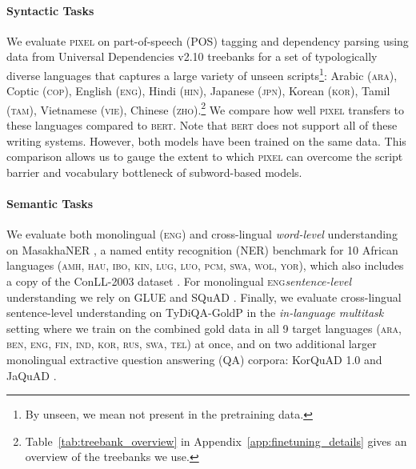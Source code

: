 \documentclass{article}
\newcommand{\model}{\textsc{pixel}\xspace}
\newcommand{\arabi}{\textsc{ara}\xspace}
\newcommand{\english}{\textsc{eng}\xspace}
\newcommand{\coptic}{\textsc{cop}\xspace}
\newcommand{\japanese}{\textsc{jpn}\xspace}
\newcommand{\hindi}{\textsc{hin}\xspace}
\newcommand{\korean}{\textsc{kor}\xspace}
\newcommand{\vietnamese}{\textsc{vie}\xspace}
\newcommand{\chinese}{\textsc{zho}\xspace}
\newcommand{\tamil}{\textsc{tam}\xspace}
\newcommand{\amharic}{\textsc{amh}\xspace}
\newcommand{\hausa}{\textsc{hau}\xspace}
\newcommand{\igbo}{\textsc{ibo}\xspace}
\newcommand{\kinyarwanda}{\textsc{kin}\xspace}
\newcommand{\luganda}{\textsc{lug}\xspace}
\newcommand{\luo}{\textsc{luo}\xspace}
\newcommand{\naija}{\textsc{pcm}\xspace}
\newcommand{\swahili}{\textsc{swa}\xspace}
\newcommand{\wolof}{\textsc{wol}\xspace}
\newcommand{\yoruba}{\textsc{yor}\xspace}
\newcommand{\russian}{\textsc{rus}\xspace}
\newcommand{\bengali}{\textsc{ben}\xspace}
\newcommand{\finnish}{\textsc{fin}\xspace}
\newcommand{\indonesian}{\textsc{ind}\xspace}
\newcommand{\telugu}{\textsc{tel}\xspace}
\begin{document}
\paragraph{Syntactic Tasks} We evaluate \model on part-of-speech (POS) tagging and dependency parsing using data from Universal Dependencies v2.10 treebanks \citep{nivre-etal-2020-universal, zeman-etal-2022-ud} for a set of typologically diverse languages that captures a large variety of unseen scripts\footnote{By unseen, we mean not present in the pretraining data.}: Arabic (\arabi), Coptic (\coptic), English (\english), Hindi (\hindi), Japanese (\japanese), Korean (\korean), Tamil (\tamil), Vietnamese (\vietnamese), Chinese (\chinese).\footnote{Table~\ref{tab:treebank_overview} in Appendix~\ref{app:finetuning_details} gives an overview of the treebanks we use.}
We compare how well \model{} transfers to these languages compared to \textsc{bert}. Note that \textsc{bert} does not support all of these writing systems. However, both models have been trained on the same data. This comparison allows us to gauge the extent to which \model can overcome the script barrier and vocabulary bottleneck of subword-based models.

\vspace{-2mm}
\paragraph{Semantic Tasks} We evaluate both monolingual (\english) and cross-lingual \emph{word-level} understanding on MasakhaNER \citep{adelani-etal-2021-masakhaner}, a named entity recognition (NER) benchmark for 10 African languages (\amharic, \hausa, \igbo, \kinyarwanda, \luganda, \luo, \naija, \swahili, \wolof, \yoruba), which also includes a copy of the ConLL-2003 dataset \citep[\english; ][]{tjong-kim-sang-de-meulder-2003-introduction}. For monolingual \english \emph{sentence-level} understanding we rely on GLUE \citep{wang-etal-2018-glue} and SQuAD \citep{rajpurkar-etal-2016-squad}. 
Finally, we evaluate cross-lingual sentence-level understanding on TyDiQA-GoldP \citep{clark-etal-2020-tydi} in the \emph{in-language multitask} setting where we train on the combined gold data in all 9 target languages (\arabi, \bengali, \english, \finnish, \indonesian, \korean, \russian, \swahili, \telugu) at once, and on two additional larger monolingual extractive question answering (QA) corpora: KorQuAD 1.0 \citep[\korean; ][]{lim-etal-2019-korquad} and JaQuAD \citep[\japanese; ][]{so2022jaquad}.

\vspace{-2mm}
\end{document}
